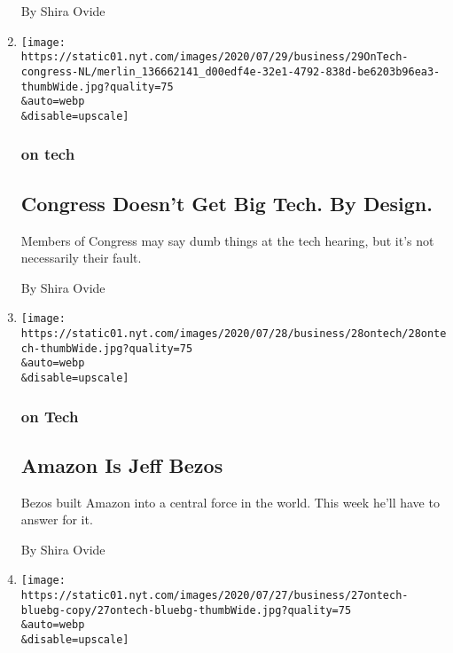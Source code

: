 \begin{enumerate}
  By Shira Ovide
\item
  \href{/2020/07/29/technology/congress-big-tech.html}{}

  \texttt{[image: https://static01.nyt.com/images/2020/07/29/business/29OnTech-congress-NL/merlin\_136662141\_d00edf4e-32e1-4792-838d-be6203b96ea3-thumbWide.jpg?quality=75\\\&auto=webp\\\&disable=upscale]}

  \hypertarget{on-tech-2}{%
  \subsubsection{on tech}\label{on-tech-2}}

  \hypertarget{congress-doesnt-get-big-tech-by-design}{%
  \subsection{Congress Doesn't Get Big Tech. By
  Design.}\label{congress-doesnt-get-big-tech-by-design}}

  Members of Congress may say dumb things at the tech hearing, but it's
  not necessarily their fault.

  By Shira Ovide
\item
  \href{/2020/07/28/technology/amazon-jeff-bezos.html}{}

  \texttt{[image: https://static01.nyt.com/images/2020/07/28/business/28ontech/28ontech-thumbWide.jpg?quality=75\\\&auto=webp\\\&disable=upscale]}

  \hypertarget{on-tech-3}{%
  \subsubsection{on Tech}\label{on-tech-3}}

  \hypertarget{amazon-is-jeff-bezos}{%
  \subsection{Amazon Is Jeff Bezos}\label{amazon-is-jeff-bezos}}

  Bezos built Amazon into a central force in the world. This week he'll
  have to answer for it.

  By Shira Ovide
\item
  \href{/2020/07/27/technology/tiktok-data-privacy.html}{}

  \texttt{[image: https://static01.nyt.com/images/2020/07/27/business/27ontech-bluebg-copy/27ontech-bluebg-thumbWide.jpg?quality=75\\\&auto=webp\\\&disable=upscale]}


\end{enumerate}
